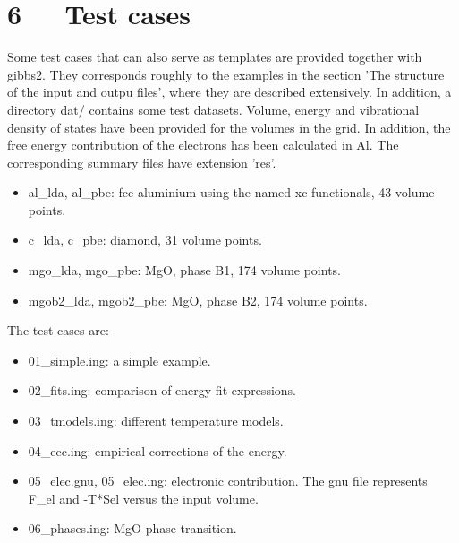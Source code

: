 \documentclass[a4paper]{article}
\begin{document}
\section{6~~~Test cases%
  \label{test-cases}%
}

Some test cases that can also serve as templates are provided together
with gibbs2. They corresponds roughly to the examples in the section
'The structure of the input and outpu files', where they are described
extensively. In addition, a directory dat/ contains some test
datasets. Volume, energy and vibrational density of states have been
provided for the volumes in the grid. In addition, the free energy
contribution of the electrons has been calculated in Al. The
corresponding summary files have extension 'res'.
%
\begin{itemize}

\item al\_lda, al\_pbe: fcc aluminium using the named xc functionals, 43
volume points.

\item c\_lda, c\_pbe: diamond, 31 volume points.

\item mgo\_lda, mgo\_pbe: MgO, phase B1, 174 volume points.

\item mgob2\_lda, mgob2\_pbe: MgO, phase B2, 174 volume points.

\end{itemize}

The test cases are:
%
\begin{itemize}

\item 01\_simple.ing: a simple example.

\item 02\_fits.ing: comparison of energy fit expressions.

\item 03\_tmodels.ing: different temperature models.

\item 04\_eec.ing: empirical corrections of the energy.

\item 05\_elec.gnu, 05\_elec.ing: electronic contribution. The gnu file
represents F\_el and -T*Sel versus the input volume.

\item 06\_phases.ing: MgO phase transition.

\end{itemize}
\end{document}
